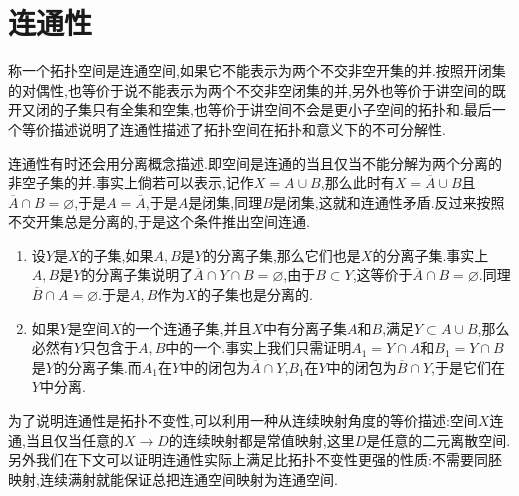 \section{连通性}

称一个拓扑空间是连通空间,如果它不能表示为两个不交非空开集的并.按照开闭集的对偶性,也等价于说不能表示为两个不交非空闭集的并,另外也等价于讲空间的既开又闭的子集只有全集和空集,也等价于讲空间不会是更小子空间的拓扑和.最后一个等价描述说明了连通性描述了拓扑空间在拓扑和意义下的不可分解性.

连通性有时还会用分离概念描述.即空间是连通的当且仅当不能分解为两个分离的非空子集的并.事实上倘若可以表示,记作$X=A\cup B$,那么此时有$X=\overline{A}\cup B$且$\overline{A}\cap B=\varnothing$,于是$A=\overline{A}$,于是$A$是闭集,同理$B$是闭集,这就和连通性矛盾.反过来按照不交开集总是分离的,于是这个条件推出空间连通.
\begin{enumerate}
	\item 设$Y$是$X$的子集,如果$A,B$是$Y$的分离子集,那么它们也是$X$的分离子集.事实上$A,B$是$Y$的分离子集说明了$\overline{A}\cap Y\cap B=\varnothing$,由于$B\subset Y$,这等价于$\overline{A}\cap B=\varnothing$.同理$\overline{B}\cap A=\varnothing$.于是$A,B$作为$X$的子集也是分离的.
	\item 如果$Y$是空间$X$的一个连通子集,并且$X$中有分离子集$A$和$B$,满足$Y\subset A\cup B$,那么必然有$Y$只包含于$A,B$中的一个.事实上我们只需证明$A_1=Y\cap A$和$B_1=Y\cap B$是$Y$的分离子集.而$A_1$在$Y$中的闭包为$\overline{A}\cap Y$,$B_1$在$Y$中的闭包为$\overline{B}\cap Y$,于是它们在$Y$中分离.
\end{enumerate}

为了说明连通性是拓扑不变性,可以利用一种从连续映射角度的等价描述:空间$X$连通,当且仅当任意的$X\to D$的连续映射都是常值映射,这里$D$是任意的二元离散空间.另外我们在下文可以证明连通性实际上满足比拓扑不变性更强的性质:不需要同胚映射,连续满射就能保证总把连通空间映射为连通空间.

